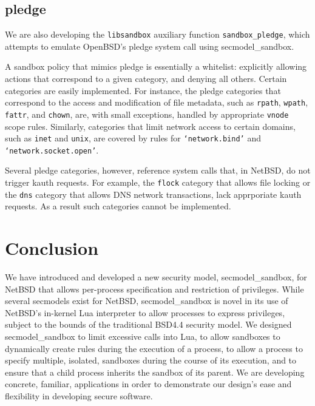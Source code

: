 \documentclass[letterpaper,twocolumn,9pt]{article}
\begin{document}
\subsection{pledge}
We are also developing the \texttt{libsandbox} auxiliary function
\texttt{sandbox\_pledge}, which  attempts to emulate OpenBSD's pledge system
call using secmodel\_sandbox.

A sandbox policy that mimics pledge is essentially a whitelist: explicitly
allowing actions that correspond to a given category, and denying all others.
Certain categories are easily implemented.  For instance, the pledge
categories that correspond to the access and modification of file metadata,
such as \texttt{rpath}, \texttt{wpath}, \texttt{fattr}, and \texttt{chown},
are, with small exceptions, handled by appropriate \texttt{vnode} scope rules.
Similarly, categories that limit network access to certain domains, such as
\texttt{inet} and \texttt{unix}, are covered by rules for
\texttt{`network.bind'} and \texttt{`network.socket.open'}.

Several pledge categories, however, reference system calls that, in NetBSD, do
not trigger kauth requests.  For example, the \texttt{flock} category that
allows file locking or the \texttt{dns} category that allows DNS network
transactions, lack apprporiate kauth requests.  As a result such categories
cannot be implemented.

\section{Conclusion}
We have introduced and developed a new security model, secmodel\_sandbox, for
NetBSD that allows per-process specification and restriction of privileges.
While several secmodels exist for NetBSD, secmodel\_sandbox is novel in its use
of NetBSD's in-kernel Lua interpreter to allow processes to express privileges,
subject to the bounds of the traditional BSD4.4 security model.  We designed
secmodel\_sandbox to limit excessive calls into Lua, to allow sandboxes to
dynamically create rules during the execution of a process, to allow a process
to specify multiple, isolated, sandboxes during the course of its execution,
and to ensure that a child process inherits the sandbox of its parent.  We are
developing concrete, familiar, applications in order to demonstrate our
design's ease and flexibility in developing secure software.
\end{document}
